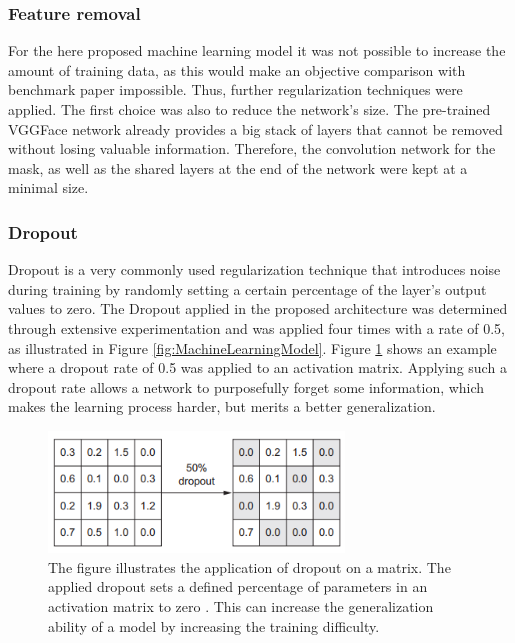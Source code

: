 \subsubsection{Feature removal}
For the here proposed machine learning model it was not possible to increase the amount of training data, as this would make an objective comparison with benchmark paper impossible. Thus, further regularization techniques were applied. The first choice was also to reduce the network's size. The pre-trained VGGFace network already provides a big stack of layers that cannot be removed without losing valuable information. Therefore, the convolution network for the mask, as well as the shared layers at the end of the network were kept at a minimal size.

\subsubsection{Dropout}
Dropout is a very commonly used regularization technique that introduces noise during training by randomly setting a certain percentage of the layer's output values to zero. The Dropout applied in the proposed architecture was determined through extensive experimentation and was applied four times with a rate of 0.5, as illustrated in Figure \ref{fig:MachineLearningModel}. Figure \ref{fig:Dropout} shows an example where a dropout rate of 0.5 was applied to an activation matrix. Applying such a dropout rate allows a network to purposefully forget some information, which makes the learning process harder, but merits a better generalization.

\begin{figure}[H]
  \begin{center}
  \includegraphics[angle=0, width=0.7\textwidth]{Figures/dropout.PNG}
  \caption[Dropout regularization]{The figure illustrates the application of dropout on a matrix. The applied dropout sets a defined percentage of parameters in an activation matrix to zero \citep{Chollet:2017:DeepLearningPython}. This can increase the generalization ability of a model by increasing the training difficulty.}
  \label{fig:Dropout}
  \end{center}
\end{figure}





